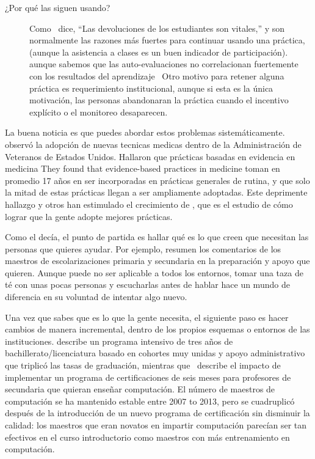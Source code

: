 \begin{description}
\item[¿Por qué las siguen usando?]
  Como~\cite{Bark2015} dice, ``Las devoluciones de los estudiantes son vitales,''
y son normalmente las razones más fuertes para continuar usando una práctica,
(aunque la asistencia a clases es un buen indicador de participación).
aunque sabemos que las auto-evaluaciones no correlacionan fuertemente con los resultados del aprendizaje~\cite{Star2014,Uttl2017}
Otro motivo para retener alguna  práctica es requerimiento institucional,
aunque si esta es la única motivación,
las personas abandonaran la práctica 
cuando el incentivo explícito o el  monitoreo desaparecen.


\end{description}

La buena noticia es que puedes abordar estos problemas sistemáticamente.
\cite{Baue2015} observó  la adopción de nuevas tecnicas medicas dentro de la Administración de Veteranos de Estados Unidos.
 Hallaron que prácticas basadas en evidencia en medicina
They found that evidence-based practices in medicine
toman en promedio 17 años en ser incorporadas en prácticas generales de rutina,
y que solo la mitad de estas prácticas llegan a ser ampliamente adoptadas.
Este deprimente hallazgo y otros han estimulado el crecimiento de
,
que es el estudio de cómo lograr que la gente adopte mejores prácticas.

Como el  decía,
el punto de partida es hallar qué es lo que creen que necesitan las personas que quieres ayudar.
Por ejemplo,
\cite{Yada2016} resumen los comentarios de los maestros de  escolarizaciones primaria y secundaria en la preparación y apoyo que quieren.
Aunque puede no ser aplicable a todos los entornos,
tomar una taza de té con unas pocas personas y escucharlas antes de hablar
hace un mundo de diferencia en su voluntad de intentar algo nuevo. 

Una vez que sabes que es lo que la gente necesita,
el siguiente paso es hacer cambios de manera incremental,
dentro de los propios esquemas o entornos de las instituciones.
\cite{Nara2018} describe un programa intensivo de tres años de bachillerato/licenciatura
basado en cohortes muy unidas y apoyo administrativo
que triplicó las tasas de graduación,
mientras que~\cite{Hu2017} describe el impacto de implementar un programa de certificaciones de seis meses
para profesores de secundaria que quieran enseñar computación.
El  número de maestros de computación se ha mantenido estable entre 2007 to 2013,
pero se cuadruplicó después de la introducción de un nuevo programa de certificación 
sin disminuir la calidad:
los maestros que eran novatos en impartir computación parecían ser tan efectivos en el curso introductorio como maestros con más entrenamiento en computación. 


